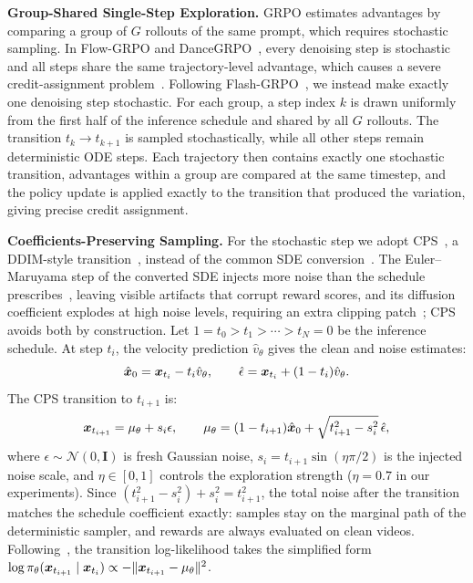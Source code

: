 \noindent\textbf{Group-Shared Single-Step Exploration.}
GRPO estimates advantages by comparing a group of $G$ rollouts of the same prompt, which requires stochastic sampling. In Flow-GRPO and DanceGRPO~\cite{liu2025flowgrpo,xue2025dancegrpo}, every denoising step is stochastic and all steps share the same trajectory-level advantage, which causes a severe credit-assignment problem~\cite{he2025tempflow,li2025mixgrpo,longcatvideo}. Following Flash-GRPO~\cite{he2026flashgrpo}, we instead make exactly one denoising step stochastic. For each group, a step index $k$ is drawn uniformly from the first half of the inference schedule and shared by all $G$ rollouts. The transition $t_k \to t_{k+1}$ is sampled stochastically, while all other steps remain deterministic ODE steps. Each trajectory then contains exactly one stochastic transition, advantages within a group are compared at the same timestep, and the policy update is applied exactly to the transition that produced the variation, giving precise credit assignment.

\noindent\textbf{Coefficients-Preserving Sampling.}
For the stochastic step we adopt CPS~\cite{wang2025cps}, a DDIM-style transition~\cite{song2020ddim}, instead of the common SDE conversion~\cite{liu2025flowgrpo}. The Euler--Maruyama step of the converted SDE injects more noise than the schedule prescribes~\cite{wang2025cps}, leaving visible artifacts that corrupt reward scores, and its diffusion coefficient explodes at high noise levels, requiring an extra clipping patch~\cite{longcatvideo}; CPS avoids both by construction. Let $1 = t_0 > t_1 > \cdots > t_N = 0$ be the inference schedule. At step $t_i$, the velocity prediction $\hat{v}_\theta$ gives the clean and noise estimates:
\begin{equation}
\hat{{\bm x}}_0 = {\bm x}_{t_i} - t_i \hat{v}_\theta, \qquad \hat{\epsilon} = {\bm x}_{t_i} + (1 - t_i) \hat{v}_\theta.
\end{equation}
The CPS transition to $t_{i+1}$ is:
\begin{equation}
{\bm x}_{t_{i+1}} = \mu_\theta + s_i \epsilon, \qquad
\mu_\theta = (1 - t_{i+1}) \hat{{\bm x}}_0 + \sqrt{t_{i+1}^2 - s_i^2}\, \hat{\epsilon},
\label{eq:cps}
\end{equation}
where $\epsilon \sim \mathcal{N}(0, \mathbf{I})$ is fresh Gaussian noise, $s_i = t_{i+1} \sin(\eta\pi/2)$ is the injected noise scale, and $\eta \in [0, 1]$ controls the exploration strength ($\eta = 0.7$ in our experiments). Since $(t_{i+1}^2 - s_i^2) + s_i^2 = t_{i+1}^2$, the total noise after the transition matches the schedule coefficient exactly: samples stay on the marginal path of the deterministic sampler, and rewards are always evaluated on clean videos. Following~\cite{wang2025cps}, the transition log-likelihood takes the simplified form $\log \pi_\theta({\bm x}_{t_{i+1}} \mid {\bm x}_{t_i}) \propto -\lVert {\bm x}_{t_{i+1}} - \mu_\theta \rVert^2$.

